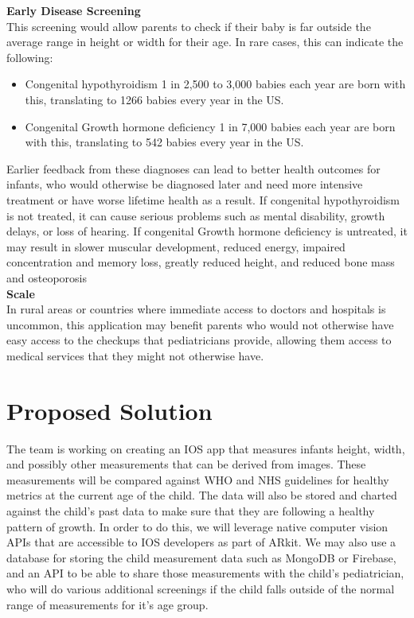 \documentclass[10pt, draftclsnofoot, letterpaper, margin=.75in, onecolumn]{IEEEtran}
\begin{document}
\textbf{Early Disease Screening}\\
This screening would allow parents to check if their baby is far outside the average range in height or width for their age. In rare cases, this can indicate the following:\\
\begin{itemize}
\item Congenital hypothyroidism 1 in 2,500 to 3,000 babies each year are born with this, translating to 1266 babies every year in the US.\\
\item Congenital Growth hormone deficiency 1 in 7,000 babies each year are born with this, translating to 542 babies every year in the US. \\
\end{itemize}
Earlier feedback from these diagnoses can lead to better health outcomes for infants, who would otherwise be diagnosed later and need more intensive treatment or have worse lifetime health as a result. If congenital hypothyroidism is not treated, it can cause serious problems such as mental disability, growth delays, or loss of hearing. If congenital Growth hormone deficiency is untreated, it may result in slower muscular development, reduced energy, impaired concentration and memory loss, greatly reduced height, and reduced bone mass and osteoporosis\\

\textbf{Scale}\\
In rural areas or countries where immediate access to doctors and hospitals is uncommon, this application may benefit parents who would not otherwise have easy access to the checkups that pediatricians provide, allowing them access to medical services that they might not otherwise have.

\section{Proposed Solution}
\par \noindent The team is working on creating an IOS app that measures infants height, width, and possibly other measurements that can be derived from images. These measurements will be compared against WHO and NHS guidelines for healthy metrics at the current age of the child. The data will also be stored and charted against the child’s past data to make sure that they are following a healthy pattern of growth. In order to do this, we will leverage native computer vision APIs that are accessible to IOS developers as part of ARkit. We may also use a database for storing the child measurement data such as MongoDB or Firebase, and an API to be able to share those measurements with the child’s pediatrician, who will do various additional screenings if the child falls outside of the normal range of measurements for it’s age group.\\
\end{document}
